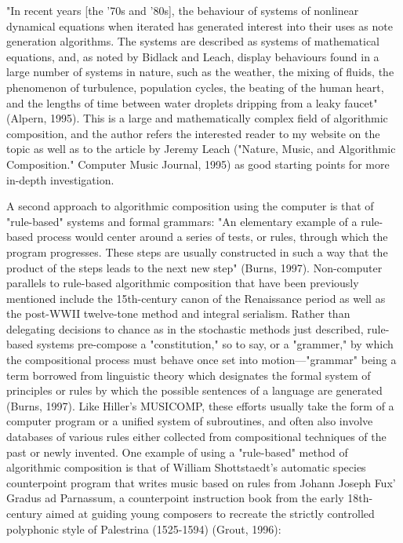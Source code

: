 \documentclass{automatextcc}
\begin{document}
"In recent years [the '70s and '80s], the behaviour of systems of nonlinear dynamical equations when iterated has generated interest into their uses as note generation algorithms. The systems are described as systems of mathematical equations, and, as noted by Bidlack and Leach, display behaviours found in a large number of systems in nature, such as the weather, the mixing of fluids, the phenomenon of turbulence, population cycles, the beating of the human heart, and the lengths of time between water droplets dripping from a leaky faucet" (Alpern, 1995).
This is a large and mathematically complex field of algorithmic composition, and the author refers the interested reader to my website on the topic as well as to the article by Jeremy Leach ("Nature, Music, and Algorithmic Composition." Computer Music Journal, 1995) as good starting points for more in-depth investigation.

A second approach to algorithmic composition using the computer is that of "rule-based" systems and formal grammars: "An elementary example of a rule-based process would center around a series of tests, or rules, through which the program progresses. These steps are usually constructed in such a way that the product of the steps leads to the next new step" (Burns, 1997). Non-computer parallels to rule-based algorithmic composition that have been previously mentioned include the 15th-century canon of the Renaissance period as well as the post-WWII twelve-tone method and integral serialism. Rather than delegating decisions to chance as in the stochastic methods just described, rule-based systems pre-compose a "constitution," so to say, or a "grammer," by which the compositional process must behave once set into motion—"grammar" being a term borrowed from linguistic theory which designates the formal system of principles or rules by which the possible sentences of a language are generated (Burns, 1997). Like Hiller's MUSICOMP, these efforts usually take the form of a computer program or a unified system of subroutines, and often also involve databases of various rules either collected from compositional techniques of the past or newly invented. One example of using a "rule-based" method of algorithmic composition is that of William Shottstaedt's automatic species counterpoint program that writes music based on rules from Johann Joseph Fux' Gradus ad Parnassum, a counterpoint instruction book from the early 18th-century aimed at guiding young composers to recreate the strictly controlled polyphonic style of Palestrina (1525-1594) (Grout, 1996):
\end{document}
